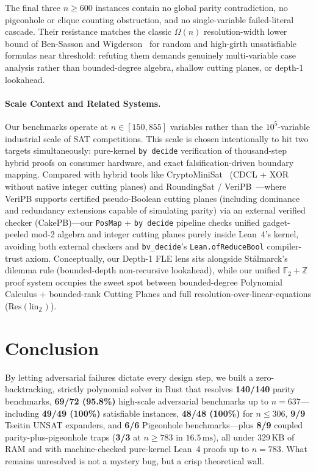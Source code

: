 \documentclass[11pt]{article}
\begin{document}
The final three $n \ge 600$ instances contain no global parity contradiction, no pigeonhole or clique counting obstruction, and no single-variable failed-literal cascade. Their resistance matches the classic $\Omega(n)$ resolution-width lower bound of Ben-Sasson and Wigderson~\cite{bensasson2001} for random and high-girth unsatisfiable formulas near threshold: refuting them demands genuinely multi-variable case analysis rather than bounded-degree algebra, shallow cutting planes, or depth-1 lookahead.

\paragraph{Scale Context and Related Systems.} Our benchmarks operate at $n \in [150, 855]$ variables rather than the $10^5$-variable industrial scale of SAT competitions. This scale is chosen intentionally to hit two targets simultaneously: pure-kernel \texttt{by decide} verification of thousand-step hybrid proofs on consumer hardware, and exact falsification-driven boundary mapping. Compared with hybrid tools like CryptoMiniSat~\cite{soos2009} (CDCL + XOR without native integer cutting planes) and RoundingSat / VeriPB~\cite{elffers2018,gocht2022}---where VeriPB supports certified pseudo-Boolean cutting planes (including dominance and redundancy extensions capable of simulating parity) via an external verified checker (CakePB)---our \texttt{PosMap} + \texttt{by decide} pipeline checks unified gadget-peeled mod-2 algebra and integer cutting planes purely inside Lean~4's kernel, avoiding both external checkers and \texttt{bv\_decide}'s \texttt{Lean.ofReduceBool} compiler-trust axiom. Conceptually, our Depth-1 FLE lens sits alongside St\aa{}lmarck's dilemma rule (bounded-depth non-recursive lookahead), while our unified $\mathbb{F}_2 + \mathbb{Z}$ proof system occupies the sweet spot between bounded-degree Polynomial Calculus + bounded-rank Cutting Planes and full resolution-over-linear-equations ($\mathrm{Res}(\mathrm{lin}_{\mathbb{Z}})$).

\section{Conclusion}

By letting adversarial failures dictate every design step, we built a zero-backtracking, strictly polynomial solver in Rust that resolves \textbf{140/140} parity benchmarks, \textbf{69/72 (95.8\%)} high-scale adversarial benchmarks up to $n = 637$---including \textbf{49/49 (100\%)} satisfiable instances, \textbf{48/48 (100\%)} for $n \le 306$, \textbf{9/9} Tseitin UNSAT expanders, and \textbf{6/6} Pigeonhole benchmarks---plus \textbf{8/9} coupled parity-plus-pigeonhole traps (\textbf{3/3} at $n \ge 783$ in $16.5\,\text{ms}$), all under $329\,\text{KB}$ of RAM and with machine-checked pure-kernel Lean~4 proofs up to $n = 783$. What remains unresolved is not a mystery bug, but a crisp theoretical wall.
\end{document}
